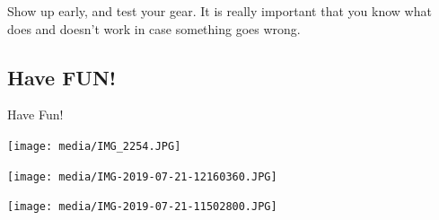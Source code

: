 \documentclass[11pt]{beamer}
\begin{document}
\begin{frame}
	Show up early, and test your gear. It is really important that you know what does and doesn't work in case something goes wrong.
\end{frame}

\subsection{Have FUN!}

\begin{frame}
	Have Fun!
\end{frame}

\begin{frame}
	\begin{center}
		\texttt{[image: media/IMG\_2254.JPG]}
	\end{center}
\end{frame}

\begin{frame}
	\begin{center}
		\texttt{[image: media/IMG-2019-07-21-12160360.JPG]}
	\end{center}
\end{frame}

\begin{frame}
	\begin{center}
		\texttt{[image: media/IMG-2019-07-21-11502800.JPG]}
	\end{center}
\end{frame}
\end{document}
